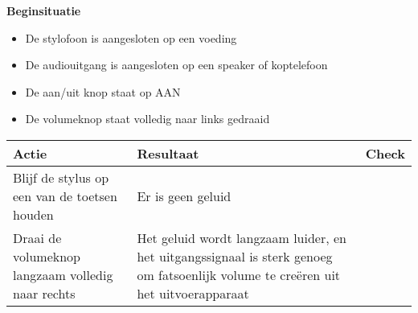 \documentclass[12pt, a4paper, dutch]{article}
\newcommand{\cb}{\Square}
\newcommand{\stroom}{De stylofoon is aangesloten op een voeding}
\newcommand{\audio}{De audiouitgang is aangesloten op een speaker of koptelefoon}
\newcommand{\aan}{De aan/uit knop staat op AAN}
\begin{document}
\begin{minipage}{\textwidth}
\textbf{Beginsituatie}
\begin{itemize}
	\item \stroom
	\item \audio
	\item \aan
	\item De volumeknop staat volledig naar links gedraaid
\end{itemize}

\medskip

\begin{tabularx}{\textwidth}{p{}p{}>{\raggedleft\arraybackslash}X}
\toprule
\textbf{Actie} & \textbf{Resultaat} & \textbf{Check}\\
\midrule
Blijf de stylus op een van de toetsen houden &
Er is geen geluid &
\cb\\

Draai de volumeknop langzaam volledig naar rechts &
Het geluid wordt langzaam luider, en het uitgangssignaal is sterk genoeg om
fatsoenlijk volume te cre\"eren uit het uitvoerapparaat &
\cb\\
\bottomrule
\end{tabularx}
\end{minipage}
\end{document}
